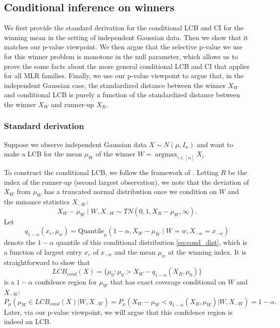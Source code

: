 \documentclass{article}
\DeclareMathOperator*{\argmax}{argmax}
\begin{document}
\begin{appendix}
\subsection{Conditional inference on winners}
\label{sec:cond_appdx}

We first provide the standard derivation for the conditional LCB and CI for the winning mean in the setting of independent Gaussian data. Then we show that it matches our p-value viewpoint. We then argue that the selective p-value we use for this winner problem is monotone in the null parameter, which allows us to prove the some facts about the more general conditional LCB and CI that applies for all MLR families. Finally, we use our p-value viewpoint to argue that, in the independent Gaussian case, the standardized distance between the winner $X_W$ and conditional LCB is purely a function of the standardized distance between the winner $X_W$ and runner-up $X_R$. 

\subsubsection{Standard derivation}

Suppose we observe independent Gaussian data $X \sim N(\mu, I_n)$ and want to make a LCB for the mean $\mu_W$ of the winner $W = \argmax_{i \in [n]} X_i$. 

To construct the conditional LCB, we follow the framework of \cite{Fithian2017}. Letting $R$ be the index of the runner-up (second largest observation), we note that the deviation of $X_{W}$ from $\mu_{W}$ has a truncated normal distribution once we condition on $W$ and the nuisance statistics $X_{-W}$:
\begin{equation}
    \label{eq:cond_dist}
    X_W - \mu_W \mid W, X_{-W} \sim TN(0, 1, X_{R} - \mu_{W}, \infty).
\end{equation}
Let
\begin{equation}
    \label{eq:cond_quantile}
    q_{1-\alpha}(x_r, \mu_w) = \text{Quantile}_{\mu}(1-\alpha, X_W -  \mu_{W} \mid W=w, X_{-w} = x_{-w})
\end{equation}
denote the $1-\alpha$ quantile of this conditional distribution \eqref{eq:cond_dist}, which is a function of largest entry $x_r$ of $x_{-w}$ and the mean $\mu_w$ at the winning index. It is straightforward to show that
\begin{equation}
\label{eq:cond_lcb}
     LCB_{cond}(X) = \{\mu_0 : \mu_0 > X_{W} - q_{1-\alpha}(X_R, \mu_0)  \} 
\end{equation}
is a $1-\alpha$ confidence region for $\mu_{W}$ that has exact coverage conditional on $W$ and  $X_{-W}$:
\begin{equation*}
    P_{\mu}( \mu_{W} \in LCB_{cond}(X) | W, X_{-W})  = P_{\mu}( X_W - \mu_W < q_{1-\alpha}(X_R,\mu_{W}) |W, X_{-W}) = 1-\alpha.
\end{equation*}
Later, via our p-value viewpoint, we will argue that this confidence region is indeed an LCB. 


\end{appendix}
\end{document}

